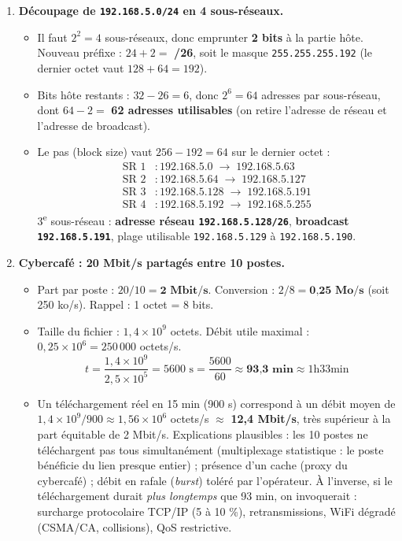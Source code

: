 \documentclass[11pt]{article}
\begin{document}
\begin{corrige}
\begin{enumerate}
    \item \textbf{Découpage de \texttt{192.168.5.0/24} en 4 sous-réseaux.}
    \begin{itemize}
        \item[a)] Il faut $2^2 = 4$ sous-réseaux, donc emprunter \textbf{2 bits} à la partie hôte. Nouveau préfixe : $24 + 2 =$ \textbf{/26}, soit le masque \texttt{255.255.255.192} (le dernier octet vaut $128 + 64 = 192$).
        \item[b)] Bits hôte restants : $32 - 26 = 6$, donc $2^6 = 64$ adresses par sous-réseau, dont $64 - 2 =$ \textbf{62 adresses utilisables} (on retire l'adresse de réseau et l'adresse de broadcast).
        \item[c)] Le pas (block size) vaut $256 - 192 = 64$ sur le dernier octet :
        \begin{align*}
        \text{SR 1} &: 192.168.5.0 \;\to\; 192.168.5.63 \\
        \text{SR 2} &: 192.168.5.64 \;\to\; 192.168.5.127 \\
        \text{SR 3} &: 192.168.5.128 \;\to\; 192.168.5.191 \\
        \text{SR 4} &: 192.168.5.192 \;\to\; 192.168.5.255
        \end{align*}
        3\textsuperscript{e} sous-réseau : \textbf{adresse réseau \texttt{192.168.5.128/26}}, \textbf{broadcast \texttt{192.168.5.191}}, plage utilisable \texttt{192.168.5.129} à \texttt{192.168.5.190}.
    \end{itemize}
    \item \textbf{Cybercafé : 20 Mbit/s partagés entre 10 postes.}
    \begin{itemize}
        \item[a)] Part par poste : $20 / 10 = \textbf{2 Mbit/s}$. Conversion : $2 / 8 = \textbf{0,25 Mo/s}$ (soit 250 ko/s). Rappel : 1 octet = 8 bits.
        \item[b)] Taille du fichier : $1,4 \times 10^9$ octets. Débit utile maximal : $0,25 \times 10^6 = 250\,000$ octets/s.
        \[ t = \frac{1{,}4 \times 10^9}{2{,}5 \times 10^5} = 5600 \text{ s} = \frac{5600}{60} \approx \textbf{93,3 min} \approx 1\text{h}33\text{min} \]
        \item[c)] Un téléchargement réel en 15 min (900 s) correspond à un débit moyen de $1{,}4 \times 10^9 / 900 \approx 1{,}56 \times 10^6$ octets/s $\approx$ \textbf{12,4 Mbit/s}, très supérieur à la part équitable de 2 Mbit/s. Explications plausibles : les 10 postes ne téléchargent pas tous simultanément (multiplexage statistique : le poste bénéficie du lien presque entier) ; présence d'un cache (proxy du cybercafé) ; débit en rafale (\emph{burst}) toléré par l'opérateur. À l'inverse, si le téléchargement durait \emph{plus longtemps} que 93 min, on invoquerait : surcharge protocolaire TCP/IP (5 à 10 \%), retransmissions, WiFi dégradé (CSMA/CA, collisions), QoS restrictive.

\end{itemize}
\end{enumerate}
\end{corrige}
\end{document}
